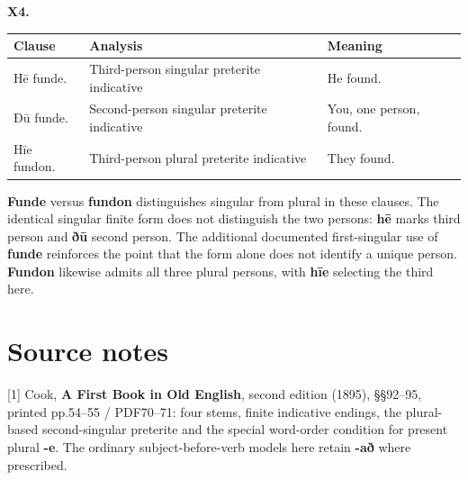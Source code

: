 \par\begin{minipage}{\linewidth}\raggedright
\textbf{X4.}

\par\begingroup
\fontsize{10.5}{13.2}\selectfont
\setlength{\LTleft}{0pt}\setlength{\LTright}{\fill}
\noindent
\begin{tabular}{@{}>{\raggedright\arraybackslash}p{23.35mm}>{\raggedright\arraybackslash}p{61.87mm}>{\raggedright\arraybackslash}p{33.15mm}@{}}
\toprule
\textbf{Clause} & \textbf{Analysis} & \textbf{Meaning} \\
\midrule
Hē funde. & Third-person singular preterite indicative & He found. \\
Ðū funde. & Second-person singular preterite indicative & You, one person, found. \\
Hīe fundon. & Third-person plural preterite indicative & They found. \\
\bottomrule
\end{tabular}
\par\endgroup

\textbf{Funde} versus \textbf{fundon} distinguishes singular from plural in these clauses. The identical singular finite form does not distinguish the two persons: \textbf{hē} marks third person and \textbf{ðū} second person. The additional documented first-singular use of \textbf{funde} reinforces the point that the form alone does not identify a unique person. \textbf{Fundon} likewise admits all three plural persons, with \textbf{hīe} selecting the third here.

\end{minipage}\par\addvspace{4pt}

\clearpage
\section*{Source notes}

\begingroup\fontsize{10}{12.8}\selectfont
[1] Cook, \textbf{A First Book in Old English}, second edition (1895), §§92–95, printed pp.54–55 /\allowbreak{} PDF70–71: four stems, finite indicative endings, the plural-based second-singular preterite and the special word-order condition for present plural \textbf{-e}. The ordinary subject-before-verb models here retain \textbf{-að} where prescribed.

